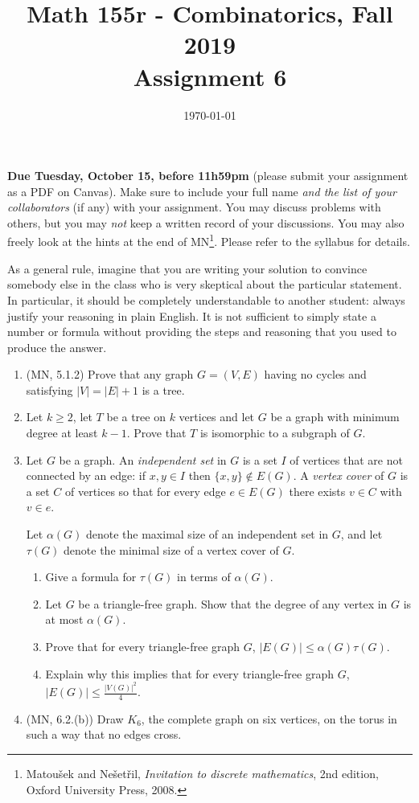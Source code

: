 \documentclass{amsart}
\title[Math 155r, Fall 2019: assignment 6]{Math 155r - Combinatorics, Fall 2019 \\ Assignment 6}
\date{\today}
\theoremstyle{definition}
\begin{document}

\vspace*{-10em}
\maketitle

\textbf{Due Tuesday, October 15, before 11h59pm} (please submit your assignment as a PDF on Canvas). Make sure to include your full name \emph{and the list of your collaborators} (if any) with your assignment. You may discuss problems with others, but you may \emph{not} keep a written record of your discussions. You may also freely look at the hints at the end of MN\footnote{Matoušek and Nešetřil, \emph{Invitation to discrete mathematics}, 2nd edition, Oxford University Press, 2008.}. Please refer to the syllabus for details.

As a general rule, imagine that you are writing your solution to convince somebody else in the class who is very skeptical about the particular statement. In particular, it should be completely understandable to another student: always justify your reasoning in plain English. It is not sufficient to simply state a number or formula without providing the steps and reasoning that you used to produce the answer.

\begin{enumerate}
\item (MN, 5.1.2) Prove that any graph $G = (V, E)$ having no cycles and satisfying $|V| = |E| + 1$ is a tree.
\item Let $k \ge 2$, let $T$ be a tree on $k$ vertices and let $G$ be a graph with minimum degree at least $k - 1$. Prove that $T$ is isomorphic to a subgraph of $G$.  
\item Let $G$ be a graph. An \emph{independent set} in $G$ is a set $I$ of vertices that are not connected by an edge: if $x, y \in I$ then $\{x, y\} \notin E (G)$. A \emph{vertex cover} of $G$ is a set $C$ of vertices so that for every edge $e \in E (G)$ there exists $v \in C$ with $v \in e$.

  Let $\alpha (G)$ denote the maximal size of an independent set in $G$, and let $\tau (G)$ denote the minimal size of a vertex cover of $G$.

  \begin{enumerate}
  \item Give a formula for $\tau (G)$ in terms of $\alpha (G)$.
  \item Let $G$ be a triangle-free graph. Show that the degree of any vertex in $G$ is at most $\alpha (G)$.
  \item Prove that for every triangle-free graph $G$, $|E (G)| \le \alpha (G) \tau (G)$.
  \item Explain why this implies that for every triangle-free graph $G$, $|E (G)| \le \frac{|V (G)|^2}{4}$.
  \end{enumerate}
\item (MN, 6.2.(b)) Draw $K_6$, the complete graph on six vertices, on the torus in such a way that no edges cross.
\end{enumerate}
\end{document}
